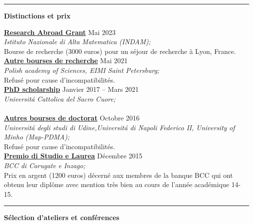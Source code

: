 \documentclass[a4paper]{article}
\newcommand{\block}[1]{\hrule \vspace{0.2cm} \textbf{\Large #1} \vspace{0.2cm}}
\newcommand{\voice}[5]{\href{#4}{\textbf{#1}} \hfill #2 \\ \textit{#3} \\ {\small #5} \vspace{0.2cm} \\}
\begin{document}
        




    \block{Distinctions et prix}

    
    \voice{Research Abroad Grant}
        {Mai 2023}
        {Istituto Nazionale di Alta Matematica (INDAM);}
        {https://www.altamatematica.it/wp-content/uploads/2022/12/bando-estero-2022-2023-1.pdf}       
        {Bourse de recherche (3000 euros) pour un séjour de recherche à Lyon, France.}
    \voice{Autre bourses de recherche}
        {Mai 2021}
        {Polish academy of Sciences, EIMI Saint Petersburg;}
        {}       
        {Refusé pour cause d'incompatibilités.}
    \voice{PhD scholarship}
        {Janvier 2017 -- Mars 2021}
        {Universit\'a Cattolica del Sacro Cuore;}
        {https://www.dropbox.com/s/pmsg20xsxd6x5yf/External_Scholarship.pdf?dl=0}       
        {\vspace{-0.5cm}}
    \voice{Autres bourses de doctorat}
        {Octobre 2016}
        {Universit\'a degli studi di Udine,Universit\'a di Napoli Federico II, University of Minho (Map-PDMA);}
        {}       
        {Refusé pour cause d'incompatibilités.}
    \voice{Premio di Studio e Laurea}
        {Décembre 2015}
        {BCC di Carugate e Inzago;}
        {https://web.archive.org/web/20191207203437/https://www.bccmilano.it/news/dettaglio_news_div.asp?i_menuID=54872&hNewsID=132411}       
        {Prix en argent (1200 euros) décerné aux membres de la banque BCC qui ont obtenu leur diplôme avec mention très bien au cours de l'année académique 14-15.}

        




 


    \block{Sélection d'ateliers et conférences}
\end{document}
